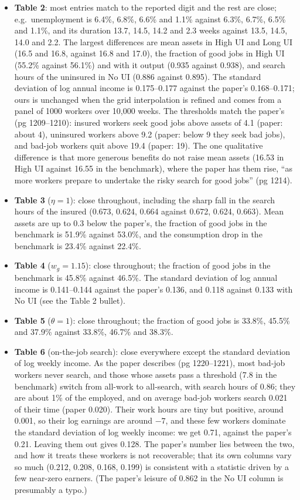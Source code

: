 \documentclass[11pt,fleqn]{article}
\begin{document}
\begin{itemize}
 \item \textbf{Table 2}: most entries match to the reported digit and the rest are close; e.g.\ unemployment is 6.4\%, 6.8\%, 6.6\% and 1.1\% against 6.3\%, 6.7\%, 6.5\% and 1.1\%, and its duration 13.7, 14.5, 14.2 and 2.3 weeks against 13.5, 14.5, 14.0 and 2.2. The largest differences are mean assets in High UI and Long UI (16.5 and 16.8, against 16.8 and 17.0), the fraction of good jobs in High UI (55.2\% against 56.1\%) and with it output (0.935 against 0.938), and search hours of the uninsured in No UI (0.886 against 0.895). The standard deviation of log annual income is 0.175--0.177 against the paper's 0.168--0.171; ours is unchanged when the grid interpolation is refined and comes from a panel of 1000 workers over 10,000 weeks. The thresholds match the paper's (pg 1209--1210): insured workers seek good jobs above assets of 4.1 (paper: about 4), uninsured workers above 9.2 (paper: below 9 they seek bad jobs), and bad-job workers quit above 19.4 (paper: 19). The one qualitative difference is that more generous benefits do not raise mean assets (16.53 in High UI against 16.55 in the benchmark), where the paper has them rise, ``as more workers prepare to undertake the risky search for good jobs'' (pg 1214).
 \item \textbf{Table 3} ($\eta=1$): close throughout, including the sharp fall in the search hours of the insured (0.673, 0.624, 0.664 against 0.672, 0.624, 0.663). Mean assets are up to 0.3 below the paper's, the fraction of good jobs in the benchmark is 51.9\% against 53.0\%, and the consumption drop in the benchmark is 23.4\% against 22.4\%.
 \item \textbf{Table 4} ($w_g=1.15$): close throughout; the fraction of good jobs in the benchmark is 45.8\% against 46.5\%. The standard deviation of log annual income is 0.141--0.144 against the paper's 0.136, and 0.118 against 0.133 with No UI (see the Table 2 bullet).
 \item \textbf{Table 5} ($\theta=1$): close throughout; the fraction of good jobs is 33.8\%, 45.5\% and 37.9\% against 33.8\%, 46.7\% and 38.3\%.
 \item \textbf{Table 6} (on-the-job search): close everywhere except the standard deviation of log weekly income. As the paper describes (pg 1220--1221), most bad-job workers never search, and those whose assets pass a threshold (7.8 in the benchmark) switch from all-work to all-search, with search hours of 0.86; they are about 1\% of the employed, and on average bad-job workers search 0.021 of their time (paper 0.020). Their work hours are tiny but positive, around 0.001, so their log earnings are around $-7$, and these few workers dominate the standard deviation of log weekly income: we get 0.71, against the paper's 0.21. Leaving them out gives 0.128. The paper's number lies between the two, and how it treats these workers is not recoverable; that its own columns vary so much (0.212, 0.208, 0.168, 0.199) is consistent with a statistic driven by a few near-zero earners. (The paper's leisure of 0.862 in the No UI column is presumably a typo.)

\end{itemize}
\end{document}
